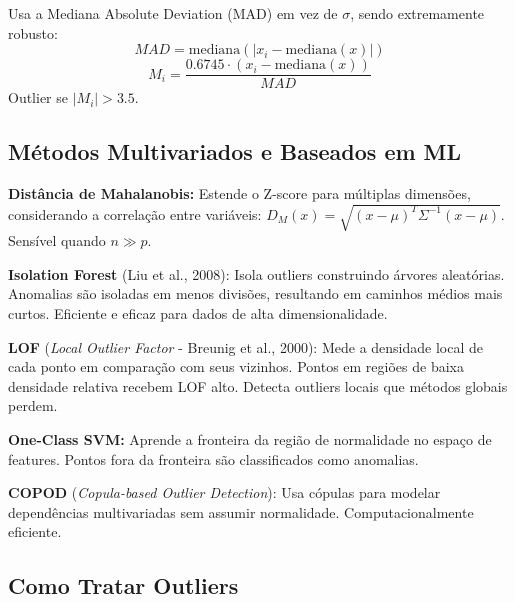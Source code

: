 \documentclass[12pt,a4paper]{article}
\begin{document}
Usa a Mediana Absolute Deviation (MAD) em vez de $\sigma$, sendo extremamente robusto:
\[
MAD = \text{mediana}(|x_i - \text{mediana}(x)|)
\]
\[
M_i = \frac{0.6745 \cdot (x_i - \text{mediana}(x))}{MAD}
\]
Outlier se $|M_i| > 3.5$.



\subsection{Métodos Multivariados e Baseados em ML}

\textbf{Distância de Mahalanobis:} Estende o Z-score para múltiplas dimensões, considerando a correlação entre variáveis:
$D_M(x) = \sqrt{(x - \mu)^T \Sigma^{-1} (x - \mu)}$. Sensível quando $n \gg p$.

\textbf{Isolation Forest} (Liu et al., 2008): Isola outliers construindo árvores aleatórias. Anomalias são isoladas em menos divisões, resultando em caminhos médios mais curtos. Eficiente e eficaz para dados de alta dimensionalidade.

\textbf{LOF} (\textit{Local Outlier Factor} - Breunig et al., 2000): Mede a densidade local de cada ponto em comparação com seus vizinhos. Pontos em regiões de baixa densidade relativa recebem LOF alto. Detecta outliers locais que métodos globais perdem.

\textbf{One-Class SVM:} Aprende a fronteira da região de normalidade no espaço de features. Pontos fora da fronteira são classificados como anomalias.

\textbf{COPOD} (\textit{Copula-based Outlier Detection}): Usa cópulas para modelar dependências multivariadas sem assumir normalidade. Computacionalmente eficiente.

\subsection{Como Tratar Outliers}
\end{document}
